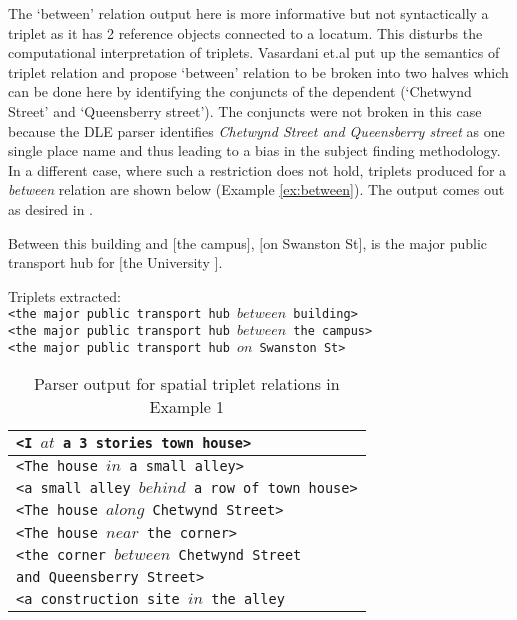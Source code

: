 \documentclass{acm_proc_article-sp}
\begin{document}
The `between' relation output here is more informative but not syntactically a triplet as it has 2 reference objects connected to a locatum. This disturbs the computational interpretation of triplets. Vasardani et.al \cite{maria:descriptions} put up the semantics of triplet relation and propose `between' relation to be broken into two halves which can be done here by identifying the conjuncts of the dependent (`Chetwynd Street' and `Queensberry street'). The conjuncts were not broken in this case because the DLE parser identifies 
\textit{Chetwynd Street and Queensberry street} as one single place name and thus leading to a bias in the subject finding methodology. In a different case, where such a restriction does not hold, triplets produced for a \textit{between} relation are shown below (Example \ref{ex:between}). The output comes out as desired in \cite{maria:descriptions}.
\begin{example}
\label{ex:between}
Between this building and $[$the campus$]$, $[$on Swanston St$]$, is the major public transport hub for $[$the University $]$.
\end{example}
Triplets extracted:\\
\texttt{<the major public transport hub $between$  building>} \\
\texttt{<the major public transport hub $between$  the campus>} \\
\texttt{<the major public transport hub $on$ Swanston St>}
\begin{table}
\begin{tabular}{|l|}
\hline
\texttt{<I $at$ a 3 stories town house>}  \\ \hline
\texttt{<The house $in$ a small alley>} \\ \hline
\texttt{<a small alley $behind$ a row of town house>}\\ \hline
\texttt{<The house $along$ Chetwynd Street>}\\ \hline
\texttt{<The house $near$ the corner>}\\ \hline
\texttt{<the corner $between$ Chetwynd Street} \\
\texttt{and Queensberry Street>}\\ \hline
\texttt{<a construction site $in$ the alley}\\ \hline
\end{tabular}
\caption{Parser output for spatial triplet relations in Example 1}
\label{table:ex1}
\end{table}
\end{document}
